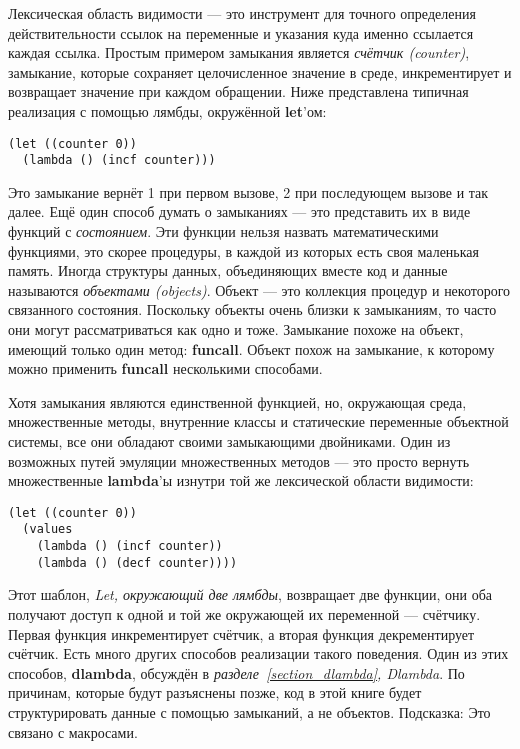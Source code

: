 Лексическая область видимости --- это инструмент для точного определения действительности ссылок на переменные и указания куда именно ссылается каждая ссылка. Простым примером замыкания является \emph{счётчик (counter)}, замыкание, которые сохраняет целочисленное значение в среде, инкрементирует и возвращает значение при каждом обращении. Ниже представлена типичная реализация с помощью лямбды, окружённой \textbf{let}'ом:

\begin{verbatim}
(let ((counter 0))
  (lambda () (incf counter)))
\end{verbatim}

Это замыкание вернёт 1 при первом вызове, 2 при последующем вызове и так далее. Ещё один способ думать о замыканиях --- это представить их в виде функций с \emph{состоянием}. Эти функции нельзя назвать математическими функциями, это скорее процедуры, в каждой из которых есть своя маленькая память. Иногда структуры данных, объединяющих вместе код и данные называются \emph{объектами (objects)}. Объект --- это коллекция процедур и некоторого связанного состояния. Поскольку объекты очень близки к замыканиям, то часто они могут рассматриваться как одно и тоже. Замыкание похоже на объект, имеющий только один метод: \textbf{funcall}. Объект похож на замыкание, к которому можно применить \textbf{funcall} несколькими способами.

Хотя замыкания являются единственной функцией, но, окружающая среда, множественные методы, внутренние классы и статические переменные объектной системы, все они обладают своими замыкающими двойниками. Один из возможных путей эмуляции множественных методов --- это просто вернуть множественные \textbf{lambda}'ы изнутри той же лексической области видимости:

\begin{verbatim}
(let ((counter 0))
  (values
    (lambda () (incf counter))
    (lambda () (decf counter))))
\end{verbatim}

Этот шаблон, \emph{Let, окружающий две лямбды}, возвращает две функции, они оба получают доступ к одной и той же окружающей их переменной --- счётчику. Первая функция инкрементирует счётчик, а вторая функция декрементирует счётчик. Есть много других способов реализации такого поведения. Один из этих способов, \textbf{dlambda}, обсуждён в \emph{разделе~\ref{section_dlambda}, Dlambda}. По причинам, которые будут разъяснены позже, код в этой книге будет структурировать данные с помощью замыканий, а не объектов. Подсказка: Это связано с макросами.

